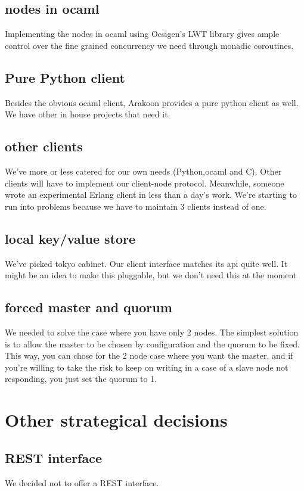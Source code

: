 \subsection{nodes in ocaml}
Implementing the nodes in ocaml using Ocsigen's LWT library gives ample control over the fine grained concurrency we need through monadic coroutines.
\subsection{Pure Python client}
Besides the obvious ocaml client, Arakoon provides a pure python client as well. We have other in house projects that need it.

\subsection{other clients}
We've more or less catered for our own needs (Python,ocaml and C).
Other clients will have to implement our client-node protocol. 
Meanwhile, someone wrote an experimental Erlang client in less than a day's work. We're starting to run into problems because we have to maintain 3 clients instead of one.

\subsection{local key/value store}
We've picked tokyo cabinet. 
Our client interface matches its api quite well. 
It might be an idea to make this pluggable, but we don't need this at the moment

\subsection{forced master and quorum}
We needed to solve the case where you have only 2 nodes.
The simplest solution is to allow the master to be chosen by configuration and the quorum to be fixed. 
This way, you can chose for the 2 node case where you want the master, 
and if you're willing to take the risk to keep on writing in a case of a slave node not responding, you just set the quorum to 1.

\section{Other strategical decisions}
\subsection{REST interface}
We decided not to offer a REST interface.

